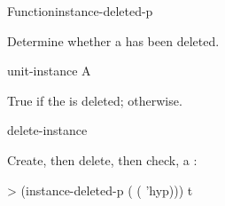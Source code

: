 \documentclass[10pt,twoside,english,pdftex]{article}
\begin{document}
\begin{functiondoc}{Function}{instance-deleted-p}{
    \returns{} }

\fnsyntax

\fnpurpose Determine whether a  has been deleted. 

\fnpackage {}

\fnmodule {}

\fnargs
\begin{args}{unit-instance}
 A 
\end{args}

\fnreturns True if the  is deleted; \nil{} otherwise.

\begin{alsos}{delete-instance}
\end{alsos}

\fnexample
{}%
%
Create, then delete, then check, a  :
\begin{example}
> (instance-deleted-p ( ( 'hyp)))
t
\end{example}

\end{functiondoc}

\end{document}
